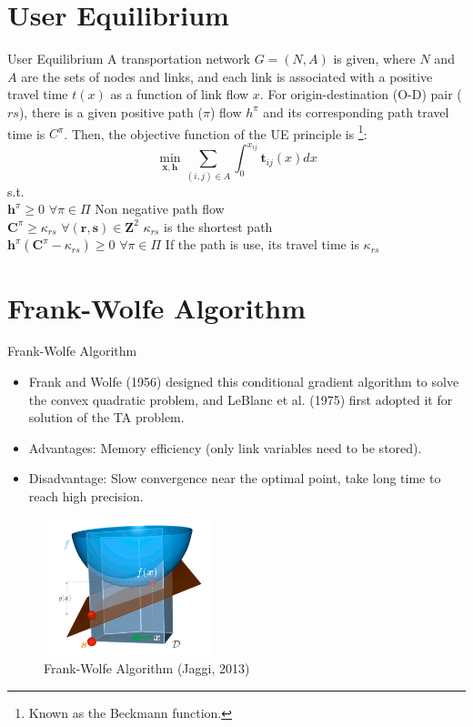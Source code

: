 \documentclass{beamer}
\newcommand{\vect}[1]{\boldsymbol{#1}}
\begin{document}
	\section{User Equilibrium}
		\begin{frame}{User Equilibrium}
		A transportation network $G = (N, A)$ is given, where $N$ and $A$ are the sets of nodes and links, and each link  is associated
		with a positive travel time $t(x)$ as a function of link flow $x$.  For origin-destination (O-D) pair ($rs$), there is a given positive path ($\pi$) flow $h^\pi$ and its corresponding path travel time is $C^\pi$. Then, the objective function of the UE principle is \footnote{Known as the Beckmann function.}:
		$$ \min_{\vect{x},\vect{h}} \sum_{(i,j) \in A}^{} \int_{0}^{x_{ij}} \vect{t}_{ij}(x)dx$$ 
		s.t. \\
		$ \vect{h}^\pi \geq 0$  \hfill $\forall \pi \in \Pi$ \hfill Non negative path flow \\
		$ \vect{C}^\pi \geq \kappa_{rs}$  \hfill $\forall (\vect{r},\vect{s}) \in \vect{Z}^2$  \hfill $\kappa_{rs}$ is the shortest path  \\
		$ \vect{h}^\pi (\vect{C}^\pi -\kappa_{rs} ) \geq 0$  \hfill $\forall \pi \in \Pi$ \hfill If the path is use, its travel time is $\kappa_{rs}$  \\

		\end{frame} 

\section{Frank-Wolfe Algorithm}
\begin{frame}{Frank-Wolfe Algorithm}
	\begin{itemize}

\item Frank and Wolfe (1956) designed this conditional gradient algorithm to solve the convex quadratic problem, and LeBlanc et al. (1975) first adopted it for solution of the TA 
problem.
\item Advantages: Memory efficiency (only link variables need to be stored).
\item Disadvantage: Slow convergence near the optimal point, take long time to reach high precision.
	\end{itemize}
\begin{figure}
	\includegraphics[width=5cm, height=4cm]{Fig/FrankWolfe.png}
	\caption{Frank-Wolfe Algorithm (Jaggi, 2013)}
\end{figure}
\end{frame}
\end{document}
